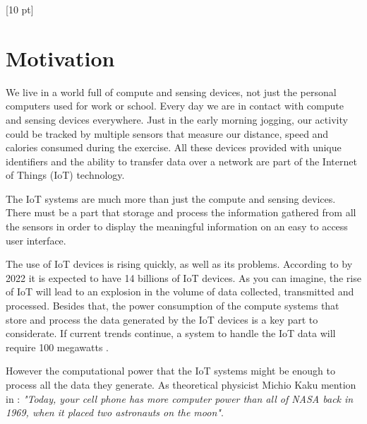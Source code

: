 \titleformat{\chapter}{\Huge\bfseries}{\thechapter}{0 pt}{\rule{340 pt}{3 pt}\\}
\titlespacing{\chapter}{100 pt}{-25 pt}{40 pt}[10 pt]	
\pagestyle{fancy}
\fancyhead[RO,RE]{\thepage}
\fancyfoot[CO,CE]{}

\chapter*{Motivation}

\normalsize
\noindent

We live in a world full of compute and sensing devices, not just the personal
computers used for work or school. Every day we are in contact with compute and
sensing devices everywhere. Just in the early morning jogging, our activity
could be tracked by multiple sensors that measure our distance, speed and
calories consumed during the exercise. All these devices provided with unique
identifiers and the ability to transfer data over a network are part of the
Internet of Things (IoT) technology. 

The IoT systems are much more than just the compute and sensing devices. There
must be a part that storage and process the information gathered from all the
sensors  in order to display the meaningful information on an easy to access
user interface. 

The use of IoT devices is rising quickly, as well as its problems. According to
\cite{Benkhelifa} by 2022 it is expected to have 14 billions of IoT devices. As
you can imagine, the rise of IoT will lead to an explosion in the volume of
data collected, transmitted and processed. Besides that, the power consumption
of the compute systems that store and process the data generated by the IoT
devices is a key part to considerate. If current trends continue, a system to
handle the IoT data will require 100 megawatts \cite{Xizhou}.

However the computational power that the IoT systems might be enough to
process all the data they generate. As  theoretical physicist Michio Kaku
mention in \cite{Michio}: \textit{"Today, your cell phone has more computer
power than all of NASA back in 1969, when it placed two astronauts on the
moon"}.

